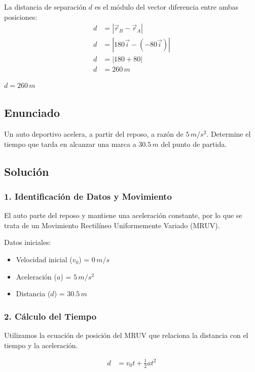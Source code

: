 \documentclass[12pt, a4paper]{article}
\begin{document}
La distancia de separación $d$ es el módulo del vector diferencia entre ambas posiciones:
\begin{align*}
d &= |\vec{r}_B - \vec{r}_A| \\
d &= |180\vec{i} - (-80\vec{i})| \\
d &= |180 + 80| \\
d &= 260 \, \si{m}
\end{align*}

\begin{tcolorbox}[colback=green!5!white, colframe=green!50!black, title=Respuesta Final]
\centering \Large $d = 260 \, \si{m}$
\end{tcolorbox}

\newpage

\subsection*{Enunciado}
Un auto deportivo acelera, a partir del reposo, a razón de $5 \, \si{m/s^2}$. Determine el tiempo que tarda en alcanzar una marca a $30.5 \, \si{m}$ del punto de partida.

\subsection*{Solución}

\subsubsection*{1. Identificación de Datos y Movimiento}
El auto parte del reposo y mantiene una aceleración constante, por lo que se trata de un Movimiento Rectilíneo Uniformemente Variado (MRUV).

Datos iniciales:
\begin{itemize}
\item Velocidad inicial ($v_0$) = $0 \, \si{m/s}$
\item Aceleración ($a$) = $5 \, \si{m/s^2}$
\item Distancia ($d$) = $30.5 \, \si{m}$
\end{itemize}

\subsubsection*{2. Cálculo del Tiempo}
Utilizamos la ecuación de posición del MRUV que relaciona la distancia con el tiempo y la aceleración.

\begin{align*}
d &= v_0 t + \frac{1}{2} a t^2
\end{align*}
\end{document}
